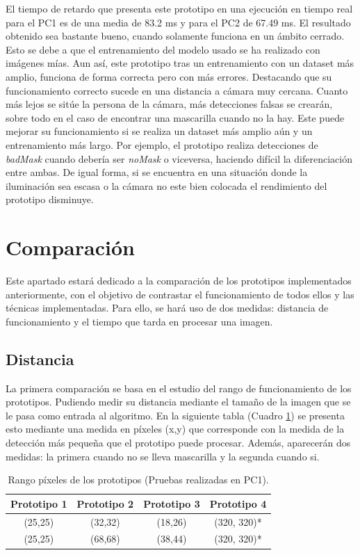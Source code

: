 El tiempo de retardo que presenta este prototipo en una ejecución en tiempo real para el PC1 es de una media de 83.2 ms y para el PC2 de 67.49 ms. El resultado obtenido sea bastante bueno, cuando solamente funciona en un ámbito cerrado. Esto se debe a que el entrenamiento del modelo usado se ha realizado con imágenes mías. Aun así, este prototipo tras un entrenamiento con un dataset más amplio, funciona de forma correcta pero con más errores. Destacando que su funcionamiento correcto sucede en una distancia a cámara muy cercana. Cuanto más lejos se sitúe la persona de la cámara, más detecciones falsas se crearán, sobre todo en el caso de encontrar una mascarilla cuando no la hay. Este puede mejorar su funcionamiento si se realiza un dataset más amplio aún y un entrenamiento más largo. Por ejemplo, el prototipo realiza detecciones de \textit{badMask} cuando debería ser \textit{noMask} o viceversa, haciendo difícil la diferenciación entre ambas. De igual forma, si se encuentra en una situación donde la iluminación sea escasa o la cámara no este bien colocada el rendimiento del prototipo disminuye.

\newpage
\section{Comparación}

Este apartado estará dedicado a la comparación de los prototipos implementados anteriormente, con el objetivo de contrastar el funcionamiento de todos ellos y las técnicas implementadas. Para ello, se hará uso de dos medidas: distancia de funcionamiento y el tiempo que tarda en procesar una imagen.

\subsection*{Distancia}
\vspace{-0.5cm}
La primera comparación se basa en el estudio del rango de funcionamiento de los prototipos. Pudiendo medir su distancia mediante el tamaño de la imagen que se le pasa como entrada al algoritmo. En la siguiente tabla (Cuadro \ref{tab:table3}) se presenta esto mediante una medida en píxeles (x,y) que corresponde con la medida de la detección más pequeña que el prototipo puede procesar. Además, aparecerán dos medidas: la primera cuando no se lleva mascarilla y la segunda cuando si.

\begin{table}[h!]
	\begin{center}
		\begin{tabular}{ |c|c|c|c| } 
			\hline
			\textbf{Prototipo 1} & \textbf{Prototipo 2} & \textbf{Prototipo 3} & \textbf{Prototipo 4} \\
			\hline
			(25,25) & (32,32)  & (18,26) & (320, 320)* \\
			(25,25) & (68,68)  & (38,44) & (320, 320)* \\
			\hline
		\end{tabular}
		\caption{Rango píxeles de los prototipos (Pruebas realizadas en PC1).}
		\label{tab:table3}
	\end{center}
\end{table}

